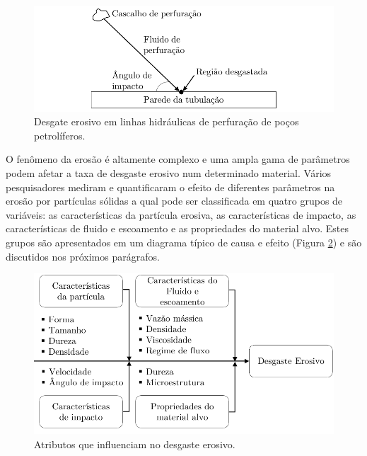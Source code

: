 \begin{figure}[H]
    \centering
    \includegraphics{Figuras/desgasteerosivoPerf.pdf}
    \caption{Desgate erosivo em linhas hidráulicas de perfuração de poços petrolíferos.}
\label{fig:erosaoperf}
\end{figure}

O fenômeno da erosão é altamente complexo e uma ampla gama de parâmetros podem afetar a taxa de desgaste erosivo num determinado material. Vários pesquisadores mediram e quantificaram o efeito de diferentes parâmetros na erosão por partículas sólidas a qual pode ser classificada em quatro grupos de variáveis: as características da partícula erosiva, as características de impacto, as características de fluido e escoamento e as propriedades do material alvo. Estes grupos são apresentados em um diagrama típico de causa e efeito (Figura \ref{fig:erosaopeixe}) e são discutidos nos próximos parágrafos.

\begin{figure}[H]
    \centering
    \includegraphics{Figuras/erosaopexie.pdf}
    \caption{Atributos que influenciam no desgaste erosivo.}
    \label{fig:erosaopeixe}
\end{figure}

